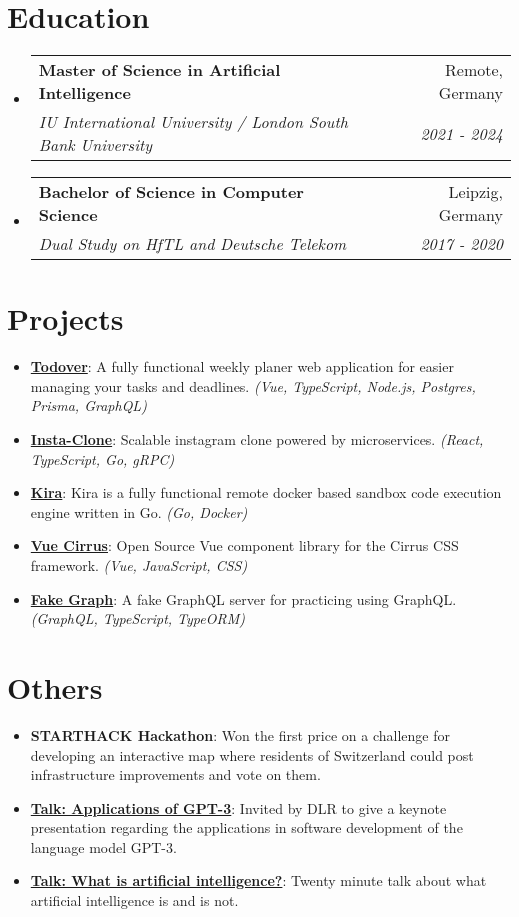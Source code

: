 \documentclass[letterpaper,11pt]{article}
\makeatletter
\newcommand{\resumeItem}[2]{
  \item\small{
    \textbf{#1}{: #2}
  }
}
\newcommand{\resumeSubheading}[4]{
  \vspace{-1pt}\item
    \begin{tabular*}{0.97\textwidth}[t]{l@{\extracolsep{\fill}}r}
      \textbf{#1} & #2 \\
      \textit{\small#3} & \textit{\small #4} \\
    \end{tabular*}
}
\newcommand{\resumeSubItem}[2]{\resumeItem{#1}{#2}}
\newcommand{\resumeSubHeadingListStart}{\begin{itemize}[leftmargin=*]}
\newcommand{\resumeSubHeadingListEnd}{\end{itemize}}
\makeatother
\begin{document}
\section{Education}
  \resumeSubHeadingListStart
    \resumeSubheading
      {Master of Science in Artificial Intelligence}{Remote, Germany}
      {IU International University / London South Bank University}{2021 - 2024}
      \vspace{-10pt}
    \resumeSubheading
      {Bachelor of Science in Computer Science}{Leipzig, Germany}
      {Dual Study on HfTL and Deutsche Telekom}{2017 - 2020}
  \resumeSubHeadingListEnd


\section{Projects}
  \resumeSubHeadingListStart
    \resumeSubItem{\href{https://github.com/FlorianWoelki/todover}{Todover}}
      {A fully functional weekly planer web application for easier managing your tasks and deadlines.
      \textit{(Vue, TypeScript, Node.js, Postgres, Prisma, GraphQL)}}
      \vspace{-5pt}
    \resumeSubItem{\href{https://github.com/FlorianWoelki/insta-clone}{Insta-Clone}}
      {Scalable instagram clone powered by microservices.
      \textit{(React, TypeScript, Go, gRPC)}}
      \vspace{-5pt}
    \resumeSubItem{\href{https://github.com/FlorianWoelki/kira}{Kira}}
      {Kira is a fully functional remote docker based sandbox code execution engine written in Go.
      \textit{(Go, Docker)}}
      \vspace{-5pt}
    \resumeSubItem{\href{https://github.com/FlorianWoelki/vue-cirrus}{Vue Cirrus}}
      {Open Source Vue component library for the Cirrus CSS framework.
      \textit{(Vue, JavaScript, CSS)}}
      \vspace{-5pt}
    \resumeSubItem{\href{https://github.com/daycademy/fake-graph}{Fake Graph}}
      {A fake GraphQL server for practicing using GraphQL.
      \textit{(GraphQL, TypeScript, TypeORM)}}
  \resumeSubHeadingListEnd


\section{Others}
  \resumeSubHeadingListStart
    \resumeSubItem{STARTHACK Hackathon}
      {Won the first price on a challenge for developing an interactive map where residents of Switzerland could post infrastructure improvements and vote on them.}
      \vspace{-5pt}
    \resumeSubItem{\href{https://florianwoelki-dlr-slides.vercel.app/}{Talk: Applications of GPT-3}}
      {Invited by DLR to give a keynote presentation regarding the applications in software development of the language model GPT-3.}
      \vspace{-5pt}
    \resumeSubItem{\href{https://youtu.be/m9kapfxwYOA}{Talk: What is artificial intelligence?}}
      {Twenty minute talk about what artificial intelligence is and is not.}
  \resumeSubHeadingListEnd
\end{document}
